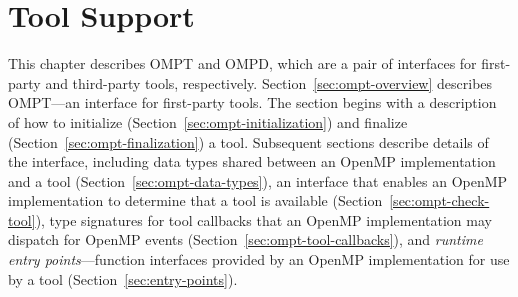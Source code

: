 \newcommand\codeptrdesc{
The argument \plc{codeptr_ra} is used to relate the implementation
of an OpenMP region back to its source code.  In cases where a runtime
routine implements the region associated with this callback,
\plc{codeptr_ra} is expected to contain the return address of the
call to the runtime routine.  In cases where the implementation of
this feature is inlined, \plc{codeptr_ra} is expected to contain the
return address of the invocation of this callback.  In cases where
attribution to source code is impossible or inappropriate,
\plc{codeptr_ra} may be \code{NULL}.
}


\chapter{Tool Support}
\label{chap:ToolsSupport}



This chapter describes OMPT and OMPD, which are a pair of interfaces for first-party and third-party
tools, respectively.  Section~\ref{sec:ompt-overview} describes OMPT---an interface for first-party tools.
The section begins with a description of how to initialize (Section~\ref{sec:ompt-initialization})
and finalize (Section~\ref{sec:ompt-finalization}) a tool.
Subsequent sections describe details of the interface, including
data types shared between an OpenMP implementation and a tool
(Section~\ref{sec:ompt-data-types}),
an interface that enables an OpenMP implementation to determine that a
tool is available (Section~\ref{sec:ompt-check-tool}),
type signatures for tool callbacks
that an OpenMP implementation may dispatch for OpenMP events
(Section~\ref{sec:ompt-tool-callbacks}), and
\emph{runtime entry points}---function interfaces
provided by an OpenMP implementation for use by a tool
(Section~\ref{sec:entry-points}).

